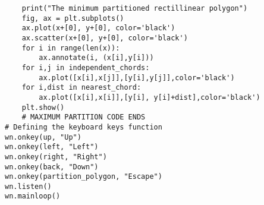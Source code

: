 \begin{lstlisting}
    print("The minimum partitioned rectillinear polygon")
    fig, ax = plt.subplots()
    ax.plot(x+[0], y+[0], color='black')
    ax.scatter(x+[0], y+[0], color='black')
    for i in range(len(x)):
        ax.annotate(i, (x[i],y[i]))
    for i,j in independent_chords:
        ax.plot([x[i],x[j]],[y[i],y[j]],color='black')
    for i,dist in nearest_chord:
        ax.plot([x[i],x[i]],[y[i], y[i]+dist],color='black')
    plt.show()
    # MAXIMUM PARTITION CODE ENDS
# Defining the keyboard keys function
wn.onkey(up, "Up")
wn.onkey(left, "Left")
wn.onkey(right, "Right")
wn.onkey(back, "Down")
wn.onkey(partition_polygon, "Escape")
wn.listen()
wn.mainloop()


\end{lstlisting}